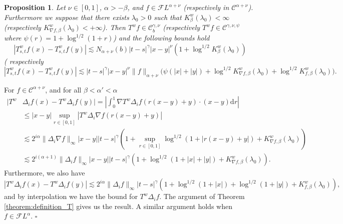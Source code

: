 \documentclass[a4paper,11pt]{article}
\newcommand{\mathd}{\mathrm{d}}
\newtheorem{proposition}[theorem]{Proposition}
\newenvironment{proof}{{\sc Proof.}}{\hfill$\square$}
\newcommand{\CC}{\mathscr C}
\newcommand{\CF}{\mathscr F}
\begin{document}
\begin{proposition}
  \label{prop:holder_continuity_of_averaging_path}Let $\nu \in [ 0,1 ]$,
  $\alpha >- \beta$, and $f \in \CF L^{\alpha + \nu}$ (respectively in
  $\CC^{\alpha + \nu}$). Furthermore we suppose that there exists $\lambda_{0}
  >0$ such that $K^{w}_{\beta} ( \lambda_{0} ) < \infty$ (respectively
  $K^{w}_{\nabla f, \beta} ( \lambda_{0} ) <+ \infty$). Then $T^{w} f \in
  \CC^{\gamma , \nu}_{b}$ (respectively $T^{w} f \in \CC^{\gamma , \nu ,
  \psi}$ where $\psi ( r ) =1+ \log^{1/2} ( 1+r )$) and the following bounds
  hold
  \[ | T^{w}_{s,t} f ( x ) -T^{w}_{s,t} f ( y ) | \lesssim N_{\alpha + \nu} (
     b ) | t-s |^{\gamma} | x-y |^{\nu} ( 1+ \log^{1/2} K^{w}_{\beta} (
     \lambda_{0} ) ) \]
  ( respectively  
  \[ | T^{w}_{s,t} f ( x ) -T^{w}_{s,t} f ( y ) | \lesssim | t-s |^{\gamma} |
     x-y |^{\nu} \| f \|_{\alpha + \nu} ( \psi ( | x | + | y | ) + \log^{1/2}
     K^{w}_{\nabla f, \beta} ( \lambda_{0} ) + \log^{1/2} K^{w}_{f, \beta} (
     \lambda_{0} ) \text{)}. \]
\end{proposition}

\begin{proof}
  For $f \in \CC^{\alpha + \nu}$, and for all $\beta < \alpha' < \alpha$
  \begin{equation*}
  \begin{split}
    | T^{w} & \Delta_{i} f ( x ) -T^{w} \Delta_{i} f ( y ) |  =  \left\lvert
    \int_{0}^{1} \nabla T^{w} \Delta_{i} f ( r  ( x-y ) +y ) \cdot ( x-y ) \mathd
    r \right\lvert\\
    & \leqslant  | x-y | \sup_{r \in [ 0,1 ]} | T^{w} \Delta_{i} \nabla f (
    r  ( x-y ) +y ) |\\
    & \lesssim  2^{i \alpha} \| \Delta_{i} \nabla f \|_{\infty} | x-y | |
    t-s |^{\gamma} ( 1+ \sup_{r \in [ 0,1 ]} \log^{1/2} ( 1+ | r  ( x-y ) +y |
    ) +K^{w}_{\nabla f, \beta} ( \lambda_{0} ) )\\
    & \lesssim   2^{i ( \alpha +1 )} \| \Delta_{i} f \|_{\infty} | x-y | |
    t-s |^{\gamma} ( 1+ \log^{1/2} ( 1+ | x | + | y | ) +K^{w}_{\nabla f,
    \beta} ( \lambda_{0} ) ).
    \end{split}
  \end{equation*}
  Furthermore, we also have
  \[ | T^{w} \Delta_{i} f ( x ) -T^{w} \Delta_{i} f ( y ) | \lesssim 2^{i
     \alpha} \| \Delta_{i} f \|_{\infty} | t-s |^{\gamma} ( 1+ \log^{1/2} ( 1+
     | x | ) + \log^{1/2} ( 1+ | y | ) +K^{w}_{f, \beta} ( \lambda_{0} ) ) ,
  \]
  and by interpolation we have the bound for $T^{w} \Delta_{i} f$. The
  argument of Theorem \ref{theorem:definition_T} gives us the result. A
  similar argument holds when $f \in \CF L^{\alpha}$.
\end{proof}
\end{document}
